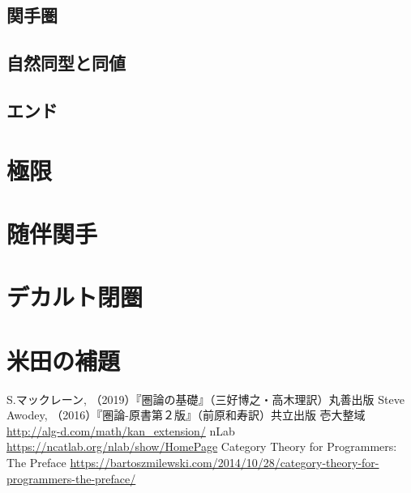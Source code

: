 \documentclass[dvipdfmx]{jsarticle}
\numberwithin{proof}{subsection}
\numberwithin{prop}{subsection}
\numberwithin{define}{subsection}
\begin{document}
	\subsection{関手圏}
	\subsection{自然同型と同値}
	\subsection{エンド}
	\section{極限}
	\section{随伴関手}
	\section{デカルト閉圏}
	\section{米田の補題}

	\begin{thebibliography}{99}
	 S.マックレーン, （2019）『圏論の基礎』（三好博之・高木理訳）丸善出版
	 Steve Awodey, （2016）『圏論-原書第２版』（前原和寿訳）共立出版
	 壱大整域 \url{http://alg-d.com/math/kan_extension/}
	 nLab \url{https://ncatlab.org/nlab/show/HomePage}
	 Category Theory for Programmers: The Preface \url{https://bartoszmilewski.com/2014/10/28/category-theory-for-programmers-the-preface/}
	\end{thebibliography}
\end{document}
